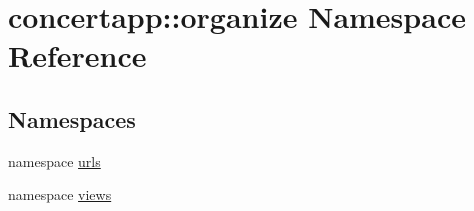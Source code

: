 \hypertarget{namespaceconcertapp_1_1organize}{
\section{concertapp::organize Namespace Reference}
\label{namespaceconcertapp_1_1organize}
}
\subsection*{Namespaces}
\begin{DoxyCompactItemize}
\item 
namespace \hyperlink{namespaceconcertapp_1_1organize_1_1urls}{urls}
\item 
namespace \hyperlink{namespaceconcertapp_1_1organize_1_1views}{views}
\end{DoxyCompactItemize}
